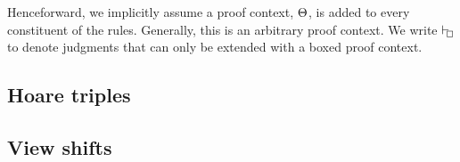 Henceforward, we implicitly assume a proof context, $\Theta$, is added to every constituent of the rules.
Generally, this is an arbitrary proof context.
We write $\vdash_{\!\!\boxempty}$ to denote judgments that can only be extended with a boxed proof context.


\subsection{Hoare triples}

\subsection{View shifts}

